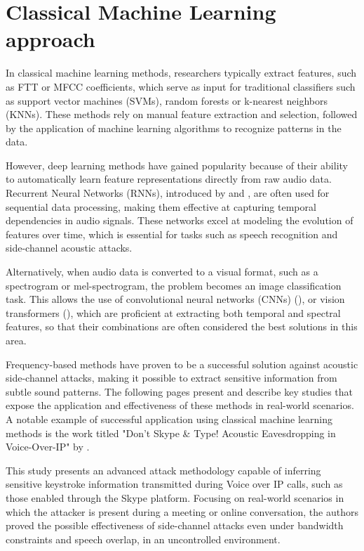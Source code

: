 \documentclass[a4paper,11pt,twoside]{report}
\theoremstyle{definition}
\begin{document}
\section*{Classical Machine Learning approach}

In classical machine learning methods, researchers typically extract features, such as FTT or MFCC coefficients, which serve as input for traditional classifiers such as support vector machines (SVMs), random forests or k-nearest neighbors (KNNs). These methods rely on manual feature extraction and selection, followed by the application of machine learning algorithms to recognize patterns in the data.

However, deep learning methods have gained popularity because of their ability to automatically learn feature representations directly from raw audio data. Recurrent Neural Networks (RNNs), introduced by \textit{\cite{rnn1}} and \textit{\cite{rnn2}}, are often used for sequential data processing, making them effective at capturing temporal dependencies in audio signals. These networks excel at modeling the evolution of features over time, which is essential for tasks such as speech recognition and side-channel acoustic attacks.

Alternatively, when audio data is converted to a visual format, such as a spectrogram or mel-spectrogram, the problem becomes an image classification task. This allows the use of convolutional neural networks (CNNs) (\textit{\cite{cnn}}), or vision transformers (\textit{\cite{vit}}), which are proficient at extracting both temporal and spectral features, so that their combinations are often considered the best solutions in this area.

Frequency-based methods have proven to be a successful solution against acoustic side-channel attacks, making it possible to extract sensitive information from subtle sound patterns. The following pages present and describe key studies that expose the application and effectiveness of these methods in real-world scenarios.\\


A notable example of successful application using classical machine learning methods is the work titled "Don’t Skype \& Type! Acoustic Eavesdropping in Voice-Over-IP" by \textit{\cite{skypetype}}.

This study presents an advanced attack methodology capable of inferring sensitive keystroke information transmitted during Voice over IP calls, such as those enabled through the Skype platform. Focusing on real-world scenarios in which the attacker is present during a meeting or online conversation, the authors proved the possible effectiveness of side-channel attacks even under bandwidth constraints and speech overlap, in an uncontrolled environment.
\end{document}
